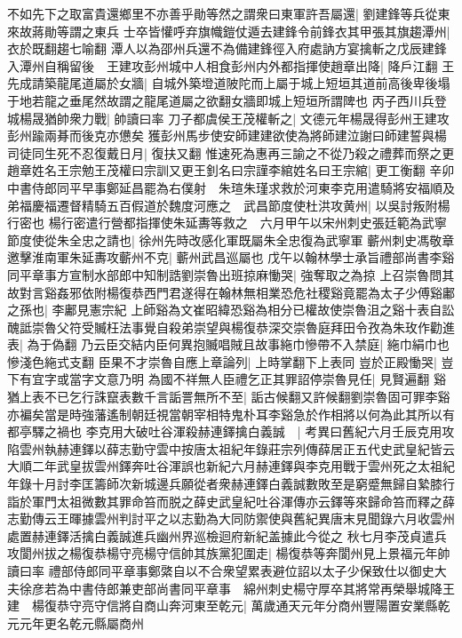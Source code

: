 不如先下之取富貴還鄉里不亦善乎勛等然之謂衆曰東軍許吾屬還|{
	劉建鋒等兵從東來故蔣勛等謂之東兵}
士卒皆懽呼弃旗幟鎧仗遁去建鋒令前鋒衣其甲張其旗趨潭州|{
	衣於既翻趨七喻翻}
潭人以為邵州兵還不為備建鋒徑入府處訥方宴擒斬之戊辰建鋒入潭州自稱留後　王建攻彭州城中人相食彭州内外都指揮使趙章出降|{
	降戶江翻}
王先成請築龍尾道屬於女牆|{
	自城外築墱道陂陀而上屬于城上短垣其道前高後卑後塌于地若龍之垂尾然故謂之龍尾道屬之欲翻女牆即城上短垣所謂陴也}
丙子西川兵登城楊晟猶帥衆力戰|{
	帥讀曰率}
刀子都虞侯王茂權斬之|{
	文德元年楊晟得彭州王建攻彭州踰兩朞而後克亦憊矣}
獲彭州馬步使安師建建欲使為將師建泣謝曰師建誓與楊司徒同生死不忍復戴日月|{
	復扶又翻}
惟速死為惠再三諭之不從乃殺之禮葬而祭之更趙章姓名王宗勉王茂權曰宗訓又更王釗名曰宗謹李綰姓名曰王宗綰|{
	更工衡翻}
辛卯中書侍郎同平早事鄭延昌罷為右僕射　朱瑄朱瑾求救於河東李克用遣騎將安福順及弟福慶福遷督精騎五百假道於魏度河應之　武昌節度使杜洪攻黄州|{
	以吳討叛附楊行密也}
楊行密遣行營都指揮使朱延夀等救之　六月甲午以宋州刺史張廷範為武寧節度使從朱全忠之請也|{
	徐州先時改感化軍既屬朱全忠復為武寧軍}
蘄州刺史馮敬章邀擊淮南軍朱延夀攻蘄州不克|{
	蘄州武昌巡屬也}
戊午以翰林學士承旨禮部尚書李谿同平章事方宣制水部郎中知制誥劉崇魯出班掠麻慟哭|{
	強奪取之為掠}
上召崇魯問其故對言谿姦邪依附楊復恭西門君遂得在翰林無相業恐危社稷谿竟罷為太子少傅谿鄘之孫也|{
	李鄘見憲宗紀}
上師谿為文崔昭緯恐谿為相分已權故使崇魯沮之谿十表自訟醜詆崇魯父符受贓枉法事覺自殺弟崇望與楊復恭深交崇魯庭拜田令孜為朱玫作勸進表|{
	為于偽翻}
乃云臣交結内臣何異抱贓唱賊且故事絁巾慘帶不入禁庭|{
	絁巾絹巾也慘淺色絁式支翻}
臣果不才崇魯自應上章論列|{
	上時掌翻下上表同}
豈於正殿慟哭|{
	豈下有宜字或當字文意乃明}
為國不祥無人臣禮乞正其罪詔停崇魯見任|{
	見賢遍翻}
谿猶上表不已乞行誅竄表數千言詬詈無所不至|{
	詬古候翻又許候翻劉崇魯固可罪李谿亦褊矣當是時強藩遙制朝廷視當朝宰相特鬼朴耳李谿急於作相將以何為此其所以有都亭驛之禍也}
李克用大破吐谷渾殺赫連鐸擒白義誠　|{
	考異曰舊紀六月壬辰克用攻陷雲州執赫連鐸以薛志勤守雲中按唐太祖紀年錄莊宗列傳薛居正五代史武皇紀皆云大順二年武皇拔雲州鐸奔吐谷渾誤也新紀六月赫連鐸與李克用戰于雲州死之太祖紀年錄十月討李匡籌師次新城邊兵願從者衆赫連鐸白義誠數敗至是窮蹙無歸自縶膝行詣於軍門太祖微數其罪命笞而脱之薛史武皇紀吐谷渾傳亦云鐸等來歸命笞而釋之薛志勤傳云王暉據雲州判討平之以志勤為大同防禦使與舊紀異唐末見聞錄六月收雲州處置赫連鐸活擒白義誠進兵幽州界巡檢迴府新紀盖據此今從之}
秋七月李茂貞遣兵攻閬州拔之楊復恭楊守亮楊守信帥其族黨犯圍走|{
	楊復恭等奔閬州見上景福元年帥讀曰率}
禮部侍郎同平章事鄭綮自以不合衆望累表避位詔以太子少保致仕以御史大夫徐彦若為中書侍郎兼吏部尚書同平章事　綿州刺史楊守厚卒其將常再榮舉城降王建　楊復恭守亮守信將自商山奔河東至乾元|{
	萬歲通天元年分商州豐陽置安業縣乾元元年更名乾元縣屬商州}
